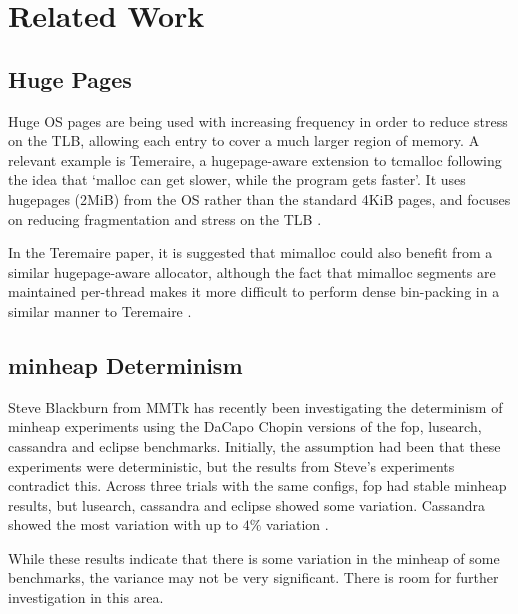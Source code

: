 \documentclass{article}
\begin{document}
\section{Related Work}
\subsection{Huge Pages}
Huge OS pages are being used with increasing frequency in order to reduce stress on the TLB, allowing each entry to cover a much larger region of memory. A relevant example is Temeraire, a hugepage-aware extension to tcmalloc following the idea that `malloc can get slower, while the program gets faster'. It uses hugepages (2MiB) from the OS rather than the standard 4KiB pages, and focuses on reducing fragmentation and stress on the TLB \cite{hunter2021beyond}.

In the Teremaire paper, it is suggested that mimalloc could also benefit from a similar hugepage-aware allocator, although the fact that mimalloc segments are maintained per-thread makes it more difficult to perform dense bin-packing in a similar manner to Teremaire \cite{hunter2021beyond}.

\subsection{minheap Determinism}
Steve Blackburn from MMTk has recently been investigating the determinism of minheap experiments using the DaCapo Chopin versions of the fop, lusearch, cassandra and eclipse benchmarks. Initially, the assumption had been that these experiments were deterministic, but the results from Steve's experiments contradict this. Across three trials with the same configs, fop had stable minheap results, but lusearch, cassandra and eclipse showed some variation. Cassandra showed the most variation with up to $4\%$ variation \cite{dacapo-repo}.

While these results indicate that there is some variation in the minheap of some benchmarks, the variance may not be very significant. There is room for further investigation in this area.
\end{document}
